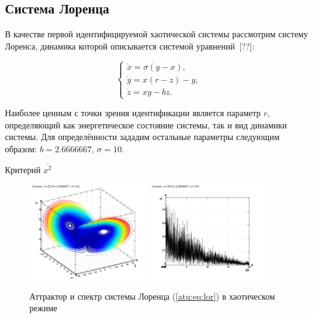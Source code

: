 
\FloatBarrier
\subsection{Система Лоренца} %


В качестве первой идентифицируемой хаотической системы рассмотрим
систему Лоренса, динамика которой описывается системой уравнений~[??]:

\begin{equation}
\begin{cases}
  \dot{x} = \sigma (y-x ) , \\
  \dot{y} = x (r-z) - y , \\
  \dot{z} = x y - b z .
\end{cases}
\label{atu:eq:lor}
\end{equation}

Наиболее ценным с точки зрения идентификации является параметр
$r$, определяющий как энергетическое состояние системы,
так и вид динамики системы.
Для определённости зададим остальные параметры следующим образом:
$b = 2.6666667$, $\sigma = 10$.

Критерий
$\overline{x^2}$


%

\begin{figure}[h!]
\begin{center}
  \includegraphics[width=0.45\textwidth]{p/cha/lor/lor0-p_xyz_r=28.png}
  \hfill
  \includegraphics[width=0.45\textwidth]{p/cha/lor/lor0_fft-p_f_r=28.png}
\end{center}
\caption{Аттрактор и спектр системы Лоренца (\ref{atu:eq:lor}) в хаотическом режиме}
\label{atu:f:lor_attractor_phase_chaos}
\end{figure}

